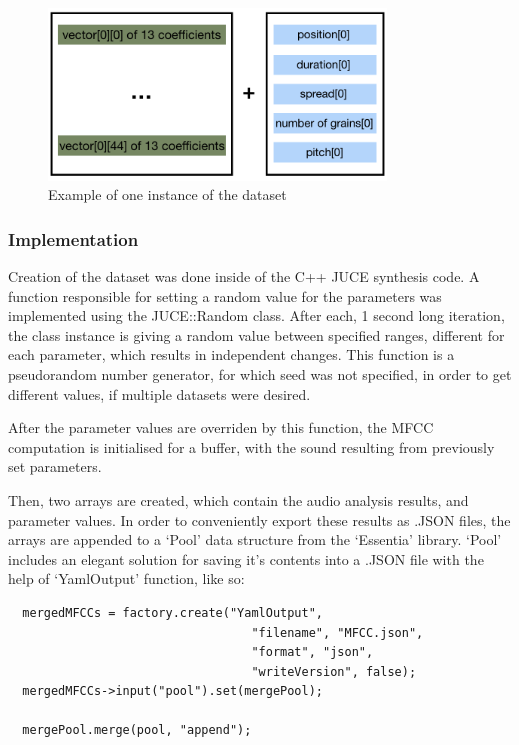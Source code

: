 \begin{figure}[!h]
\caption{Example of one instance of the dataset}
\centering
\includegraphics[width=0.8\textwidth]{images/dataset_example}
\end{figure}

\subsubsection{Implementation}

Creation of the dataset was done inside of the C++ JUCE
synthesis code. A function responsible for setting a random value for
the parameters was implemented using the JUCE::Random class. After
each, 1 second long iteration, the class instance is giving a random
value between specified ranges, different for each parameter, which
results in independent changes. This function is a pseudorandom number
generator, for which seed was not specified, in order to get different
values, if multiple datasets were desired.

After the parameter values are overriden by this function, the MFCC
computation is initialised for a buffer, with the sound resulting from
previously set parameters.

Then, two arrays are created, which contain the audio analysis
results, and parameter values. In order to conveniently export these
results as .JSON files, the arrays are appended to a `Pool' data
structure from the `Essentia' library. `Pool' includes an elegant
solution for saving it's contents into a .JSON file with the help of
`YamlOutput' function, like so:

\begin{lstlisting}
  mergedMFCCs = factory.create("YamlOutput",
                                  "filename", "MFCC.json",
                                  "format", "json",
                                  "writeVersion", false);
  mergedMFCCs->input("pool").set(mergePool);

  mergePool.merge(pool, "append");
\end{lstlisting}

